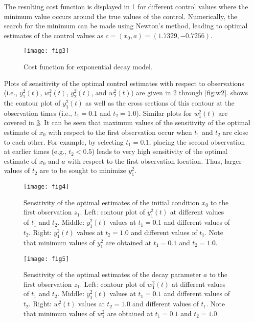 \documentclass{article}
\begin{document}
The resulting cost function is displayed in \cref{fig:cost} for different control values where the minimum value occurs around the true values of the control. Numerically, the search for the minimum can be made using Newton’s method, leading to optimal estimates of the control values as $c = (x_0, a) = (1.7329,-0.7256)$.
\begin{figure}[ht!]
    \centering
    \texttt{[image: fig3]}
    \caption{Cost function for exponential decay model.}
    \label{fig:cost}
\end{figure}

Plots of sensitivity of the optimal control estimates with respect to observations (i.e., $y_1^2(t)$, $w_1^2(t)$, $y_2^2(t)$, and $w_2^2(t)$) are given in \cref{fig:y1} through \cref{fig:w2}.  shows the contour plot of $y_1^2(t)$ as well as the cross sections of this contour at the observation times (i.e., $t_1 = 0.1$ and $t_2 = 1.0$). 
Similar plots for $w_1^2(t)$ are covered in \cref{fig:w1}. It can be seen that maximum values of the sensitivity of the optimal estimate of $x_0$ with respect to the first observation occur when $t_1$ and $t_2$ are close to each other. For example, by selecting $t_1=0.1$, placing the second observation at earlier times (e.g., $t_2<0.5$) leads to very high sensitivity of the optimal estimate of $x_0$ and $a$ with respect to the first observation location. Thus, larger values of $t_2$ are to be sought to minimize $y_1^2$. 

\begin{figure}[ht!]
    \centering
    \texttt{[image: fig4]}
    \caption{Sensitivity of the optimal estimates of the initial condition $x_0$ to the first observation $z_1$. Left: contour plot of $y_1^2(t)$ at different values of $t_1$ and $t_2$. Middle: $y_1^2(t)$ values at $t_1=0.1$ and different values of $t_2$. Right: $y_1^2(t)$ values at $t_2=1.0$ and different values of $t_1$. Note that minimum values of $y_1^2$ are obtained at $t_1=0.1$ and $t_2=1.0$.}
    \label{fig:y1}
\end{figure}

\begin{figure}[ht!]
    \centering
    \texttt{[image: fig5]}
    \caption{Sensitivity of the optimal estimates of the decay parameter $a$ to the first observation $z_1$. Left: contour plot of $w_1^2(t)$ at different values of $t_1$ and $t_2$. Middle: $y_1^2(t)$ values at $t_1=0.1$ and different values of $t_2$. Right: $w_1^2(t)$ values at $t_2=1.0$ and different values of $t_1$. Note that minimum values of $w_1^2$ are obtained at $t_1=0.1$ and $t_2=1.0$.}
    \label{fig:w1}
\end{figure}
\end{document}
